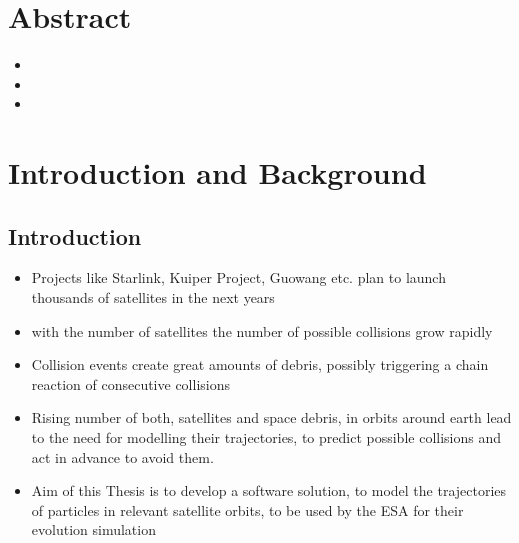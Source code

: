 \documentclass[11pt,
               a4paper,
               bibtotoc,
               idxtotoc,
               headsepline,
               footsepline,
               footexclude,
               BCOR12mm,
               DIV13,
               openany,   %
               ]
               {scrbook}
\begin{document}
\lipsum[2]

\cleardoublepage


\tableofcontents
\thispagestyle{empty}
\cleardoubleemptypage


\mainmatter
\part{Abstract}
    \begin{itemize}
        \item
        \item
        \item
    \end{itemize}

\part{Introduction and Background}
\chapter{Introduction}
    \begin{itemize}
        \item Projects like Starlink, Kuiper Project, Guowang etc. plan to launch thousands of satellites in the next years
        \item with the number of satellites the number of possible collisions grow rapidly
        \item Collision events create great amounts of debris, possibly triggering a chain reaction of consecutive collisions
        \item Rising number of both, satellites and space debris, in orbits around earth lead to the need for modelling their trajectories, to predict possible collisions and act in advance to avoid them.
        \item Aim of this Thesis is to develop a software solution, to model the trajectories of particles in relevant satellite orbits, to be used by the ESA for their evolution simulation
    \end{itemize}
\end{document}
